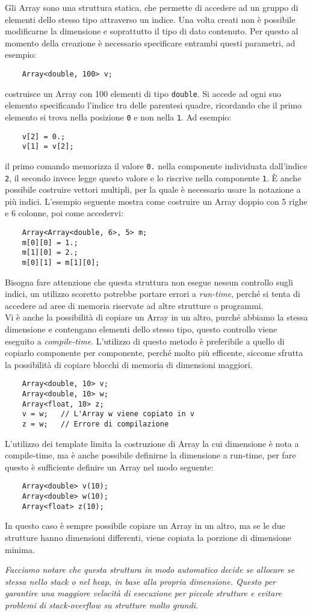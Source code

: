 Gli Array sono una struttura statica, che permette di accedere ad un gruppo di elementi
dello stesso tipo attraverso un indice. Una volta creati non \`e possibile modificarne la
dimensione e soprattutto il tipo di dato contenuto. Per questo al momento della creazione
\`e necessario specificare entrambi questi parametri, ad esempio:
\begin{verbatim}
	Array<double, 100> v;
\end{verbatim}
costruisce un Array con 100 elementi di tipo \texttt{double}. Si accede ad ogni suo elemento
specificando l'indice tra delle parentesi quadre, ricordando che il primo elemento si trova
nella posizione \texttt{0} e non nella \texttt{1}. Ad esempio:
\begin{verbatim}
	v[2] = 0.;
	v[1] = v[2];
\end{verbatim}
il primo comando memorizza il valore \texttt{0.} nella componente individuata dall'indice
\texttt{2}, il secondo invece legge questo valore e lo riscrive nella componente \texttt{1}.
\`{E} anche possibile costruire vettori multipli, per la quale \`e necessario usare la 
notazione a pi\`u indici. L'esempio seguente mostra come costruire un Array doppio con 5 righe
e 6 colonne, poi come accedervi:
\begin{verbatim}
	Array<Array<double, 6>, 5> m;
	m[0][0] = 1.;
	m[1][0] = 2.;
	m[0][1] = m[1][0];
\end{verbatim}
Bisogna fare attenzione che questa struttura non esegue nessun controllo sugli indici, un
utilizzo scoretto potrebbe portare errori a \textit{run-time}, perch\'e si tenta di accedere
ad aree di memoria riservate ad altre strutture o programmi. \\
Vi \`e anche la possibilit\`a di copiare un Array in un altro, purch\'e abbiamo la stessa dimensione
e contengano elementi dello stesso tipo, questo controllo viene eseguito a \textit{compile-time}.
L'utilizzo di questo metodo \`e preferibile a quello di copiarlo componente per componente, perch\'e
molto pi\`u efficente, siccome sfrutta la possibilit\`a di copiare blocchi di memoria di dimensioni
maggiori.
\begin{verbatim}
	Array<double, 10> v;
	Array<double, 10> w;
	Array<float, 10> z;
	v = w;   // L'Array w viene copiato in v
	z = w;   // Errore di compilazione
\end{verbatim}

L'utilizzo dei template limita la costruzione di Array la cui dimensione \`e nota a compile-time,
ma \`e anche possibile definirne la dimensione a run-time, per fare questo \`e sufficiente definire
un Array nel modo seguente:
\begin{verbatim}
	Array<double> v(10);
	Array<double> w(10);
	Array<float> z(10);
\end{verbatim}
In questo caso \`e sempre possibile copiare un Array in un altro, ma se le due strutture hanno dimensioni
differenti, viene copiata la porzione di dimensione minima.

\textit{Facciamo notare che questa struttura in modo automatico decide se allocare se stessa nello
stack o nel heap, in base alla propria dimensione. Questo per garantire una maggiore velocit\`a di
esecuzione per piccole strutture e evitare problemi di stack-overflow su strutture molto grandi.}
